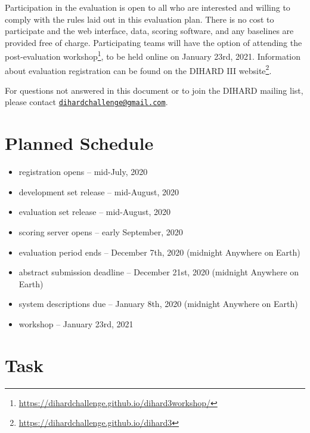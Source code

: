\documentclass{article}
\newcommand{\email}[1]{\href{mailto:#1}{\nolinkurl{#1}}}
\begin{document}
Participation in the evaluation is open to all who are interested and willing to comply with the rules laid out in this evaluation plan. There is no cost to participate and the web interface, data, scoring software, and any baselines are provided free of charge. Participating teams will have the option of attending the post-evaluation workshop\footnote{\url{https://dihardchallenge.github.io/dihard3workshop/}}, to be held online on January 23rd, 2021. Information about evaluation registration can be found on the DIHARD III website\footnote{\url{https://dihardchallenge.github.io/dihard3}}.

For questions not answered in this document or to join the DIHARD mailing list, please contact \email{dihardchallenge@gmail.com}. 
    
    
    
    
    
    
    
\section{Planned Schedule}
\label{sec:schedule}
	\begin{itemize}
        \item registration opens  -- mid-July, 2020
    	\item development set release  --  mid-August, 2020
    	\item evaluation set release  --  mid-August, 2020
    	\item scoring server opens  --  early September, 2020
    	\item evaluation period ends  --  December 7th, 2020 (midnight Anywhere on Earth)
    	\item abstract submission deadline  --  December 21st, 2020 (midnight Anywhere on Earth)
    	\item system descriptions due  --  January 8th, 2020 (midnight Anywhere on Earth)
    	\item workshop  --  January 23rd, 2021
    \end{itemize}

    

\section{Task}
\end{document}
